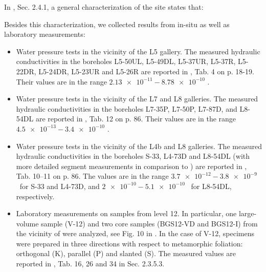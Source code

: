In \cite{tz_char_1}, Sec. 2.4.1, a general characterization of the site states
that:
%
\begin{center}
\begin{minipage}{0.8\textwidth}
\it {}
\end{minipage}
\end{center}
%
Besides this characterization, we collected results from in-situ as well as
laboratory measurements:
\begin{itemize}
\item Water pressure tests in the vicinity of the L5 gallery. The measured
hydraulic conductivities in the boreholes L5-50UL, L5-49DL, L5-37UR, L5-37R,
L5-22DR, L5-24DR, L5-23UR and L5-26R are reported in \cite{tz_monitoring},
Tab. 4 on p. 18-19. Their values are in the range
$\num{2.13e-11}-\num{8.78e-10}$ \mps.

\item Water pressure tests in the vicinity of the L7 and L8 galleries. The
measured hydraulic conductivities in the boreholes L7-35P, L7-50P, L7-87D, and
L8-54DL are reported in \cite{tz_char_2}, Tab. 12 on p. 86. Their values are
in the range $\num{4.5e-13}-\num{3.4e-10}$ \mps.

\item Water pressure tests in the vicinity of the L4b and L8 galleries. The
measured hydraulic conductivities in the boreholes S-33, L4-73D and L8-54DL
(with more detailed segment measurements in comparison to \cite{tz_char_2}) are
reported in \cite{tz_char_3}, Tab. 10--11 on p. 86. The values are in the range
$\num{3.7e-12}-\num{3.8e-9}$ \mps ~for S-33 and L4-73D, and
$\num{2e-10}-\num{5.1e-10}$ \mps ~for L8-54DL, respectively.

\item Laboratory measurements on samples from level 12. In particular, one
large-volume sample (V-12) and two core samples (BGS12-VD and BGS12-I) from
the vicinity of \URFBI were analyzed, see Fig. 10 in \cite{tz_hh}.
In the case of V-12, specimens were prepared in three directions with respect
to metamorphic foliation: orthogonal (K), parallel (P) and slanted (S).
The measured values are reported in \cite{tz_hh}, Tab. 16, 26 and 34 in
Sec. 2.3.5.3.
\end{itemize}

